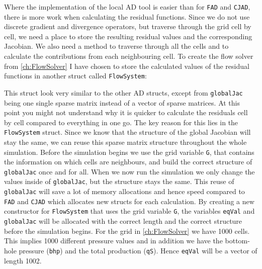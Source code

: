 Where the implementation of the local AD tool is easier than for \texttt{FAD} and \texttt{CJAD}, there is more work when calculating the residual functions. Since we do not use discrete gradient and divergence operators, but traverse through the grid cell by cell, we need a place to store the resulting residual values and the corresponding Jacobian. We also need a method to traverse through all the cells and to calculate the contributions from each neighbouring cell. %
To create the flow solver from \autoref{ch:FlowSolver} I have chosen to store the calculated values of the residual functions in another struct called \texttt{FlowSystem}:

This struct look very similar to the other AD structs, except from \texttt{globalJac} being one single sparse matrix instead of a vector of sparse matrices. At this point you might not understand why it is quicker to calculate the residuals cell by cell compared to everything in one go. The key reason for this lies in the \texttt{FlowSystem} struct. Since we know that the structure of the global Jacobian will stay the same, we can reuse this sparse matrix structure throughout the whole simulation. Before the simulation begins we use the grid variable \texttt{G}, that contains the information on which cells are neighbours, and build the correct structure of \texttt{globalJac} once and for all. When we now run the simulation we only change the values inside of \texttt{globalJac}, but the structure stays the same. This reuse of \texttt{globalJac} will save a lot of memory allocations and hence speed compared to \texttt{FAD} and \texttt{CJAD} which allocates new structs for each calculation. By creating a new constructor for \texttt{FlowSystem} that uses the grid variable \texttt{G}, the variables \texttt{eqVal} and \texttt{globalJac} will be allocated with the correct length and the correct structure before the simulation begins. For the grid in \autoref{ch:FlowSolver} we have 1000 cells. This implies 1000 different pressure values and in addition we have the bottom-hole pressure (\texttt{bhp}) and the total production (\texttt{qS}). Hence \texttt{eqVal} will be a vector of length 1002.

